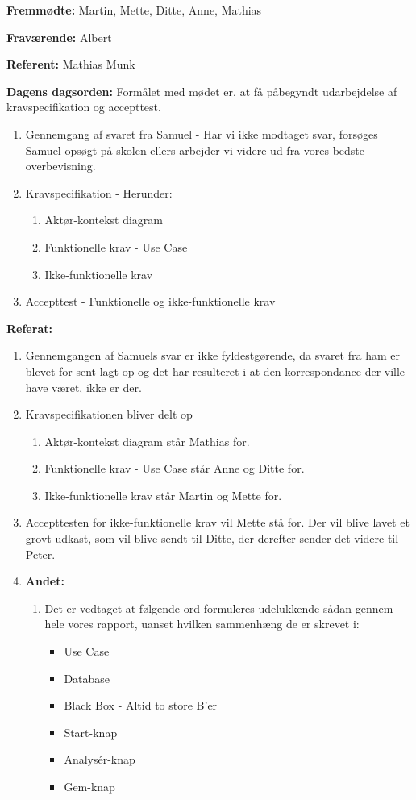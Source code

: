 \textbf{Fremmødte:} Martin, Mette, Ditte, Anne, Mathias

\textbf{Fraværende:} Albert

\textbf{Referent:} Mathias Munk

\textbf{Dagens dagsorden:}
\newline
Formålet med mødet er, at få påbegyndt udarbejdelse af kravspecifikation og accepttest.
\begin{enumerate}
\item Gennemgang af svaret fra Samuel - Har vi ikke modtaget svar, forsøges Samuel opsøgt på skolen ellers arbejder vi videre ud fra vores bedste overbevisning.

\item Kravspecifikation - Herunder:

\begin{enumerate}
\item Aktør-kontekst diagram
\item Funktionelle krav - Use Case
\item Ikke-funktionelle krav
\end{enumerate}
\item Accepttest - Funktionelle og ikke-funktionelle krav
\end{enumerate}

\textbf{Referat:}

\begin{enumerate}
\item Gennemgangen af Samuels svar er ikke fyldestgørende, da svaret fra ham er blevet for sent lagt op og det har resulteret i at den korrespondance der ville have været, ikke er der.
\item Kravspecifikationen bliver delt op
\begin{enumerate}
\item Aktør-kontekst diagram står Mathias for.
\item Funktionelle krav - Use Case står Anne og Ditte for.
\item Ikke-funktionelle krav står Martin og Mette for.
\end{enumerate}
\item Accepttesten for ikke-funktionelle krav vil Mette stå for. Der vil blive lavet et grovt udkast, som vil blive sendt til Ditte, der derefter sender det videre til Peter.
\item \textbf{Andet:}
\begin{enumerate}
\item Det er vedtaget at følgende ord formuleres udelukkende sådan gennem hele vores rapport, uanset hvilken sammenhæng de er skrevet i:
\begin{itemize}
\item Use Case
\item Database
\item Black Box - Altid to store B'er
\item Start-knap
\item Analysér-knap
\item Gem-knap
\end{itemize}
\end{enumerate}
\end{enumerate}

